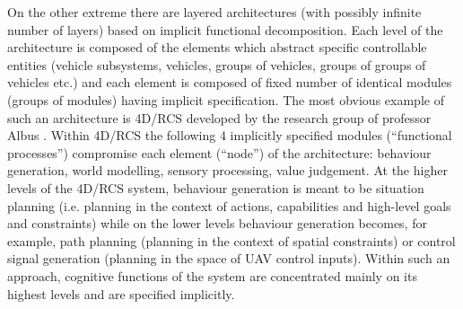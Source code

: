\documentclass[review]{elsarticle}
\begin{document}
On the other extreme there are layered architectures (with possibly infinite number of layers) based on implicit functional decomposition. Each level of the architecture is composed of the elements which abstract specific controllable entities (vehicle subsystems, vehicles, groups of vehicles, groups of groups of vehicles etc.) and each element is composed of fixed number of identical modules (groups of modules) having implicit specification. The most obvious example of such an architecture is 4D/RCS developed by the research group of professor Albus \cite{Albus2002}. Within 4D/RCS the following 4 implicitly specified modules (``functional processes'') compromise each element (``node'') of the architecture: behaviour generation, world modelling, sensory processing, value judgement. At the higher levels of the 4D/RCS system, behaviour generation is meant to be situation planning (i.e. planning in the context of actions, capabilities and high-level goals and constraints) while on the lower levels behaviour generation becomes, for example, path planning (planning in the context of spatial constraints) or control signal generation (planning in the space of UAV control inputs). Within such an approach, cognitive functions of the system are concentrated mainly on its highest levels and are specified implicitly. 
\end{document}
